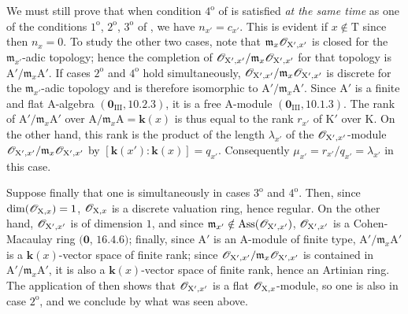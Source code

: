 \begin{env}[21.10.11]
\label{IV.21.10.11}
We must still prove that when condition $4^{\mathrm{o}}$ of  is satisfied \emph{at the same time} as one of the conditions $1^{\mathrm{o}}$, $2^{\mathrm{o}}$, $3^{\mathrm{o}}$ of , we have $n_{x'}=c_{x'}$.
This is evident if $x\notin\mathrm{T}$ since then $n_x=0$.
To study the other two cases, note that $\mathfrak{m}_x\mathscr{O}_{\mathrm{X}',x'}$ is closed for the $\mathfrak{m}_{x'}$-adic topology; hence the completion of $\mathscr{O}_{\mathrm{X}',x'}/\mathfrak{m}_x\mathscr{O}_{\mathrm{X}',x'}$ for that topology is $\mathrm{A}'/\mathfrak{m}_x\mathrm{A}'$.
If cases $2^{\mathrm{o}}$ and $4^{\mathrm{o}}$ hold simultaneously, $\mathscr{O}_{\mathrm{X}',x'}/\mathfrak{m}_x\mathscr{O}_{\mathrm{X}',x'}$ is discrete for the $\mathfrak{m}_{x'}$-adic topology and is therefore isomorphic to $\mathrm{A}'/\mathfrak{m}_x\mathrm{A}'$.
Since $\mathrm{A}'$ is a finite and flat $\mathrm{A}$-algebra $(\mathbf{0}_{\mathrm{III}},10.2.3)$, it is a free $\mathrm{A}$-module $(\mathbf{0}_{\mathrm{III}},10.1.3)$.
The rank of $\mathrm{A}'/\mathfrak{m}_x\mathrm{A}'$ over $\mathrm{A}/\mathfrak{m}_x\mathrm{A}=\boldsymbol{k}(x)$ is thus equal to the rank $r_{x'}$ of $\mathrm{K}'$ over $\mathrm{K}$.
On the other hand, this rank is the product of the length $\lambda_{x'}$ of the $\mathscr{O}_{\mathrm{X}',x'}$-module $\mathscr{O}_{\mathrm{X}',x'}/\mathfrak{m}_x\mathscr{O}_{\mathrm{X}',x'}$ by $[\boldsymbol{k}(x'): \boldsymbol{k}(x)]=q_{x'}$.
Consequently $\mu_{x'}=r_{x'}/q_{x'}=\lambda_{x'}$ in this case.

Suppose finally that one is simultaneously in cases $3^{\mathrm{o}}$ and $4^{\mathrm{o}}$.
Then, since $\dim(\mathscr{O}_{\mathrm{X},x})=1$, $\mathscr{O}_{\mathrm{X},x}$ is a discrete valuation ring, hence regular.
On the other hand, $\mathscr{O}_{\mathrm{X}',x'}$ is of dimension $1$, and since $\mathfrak{m}_{x'}\notin\operatorname{Ass}(\mathscr{O}_{\mathrm{X}',x'})$, $\mathscr{O}_{\mathrm{X}',x'}$ is a Cohen-Macaulay ring $(\mathbf{0}$, $16.4.6)$; finally, since $\mathrm{A}'$ is an A-module of finite type, $\mathrm{A}'/\mathfrak{m}_x\mathrm{A}'$ is a $\boldsymbol{k}(x)$-vector space of finite rank; since $\mathscr{O}_{\mathrm{X}',x'}/\mathfrak{m}_x\mathscr{O}_{\mathrm{X}',x'}$ is contained in $\mathrm{A}'/\mathfrak{m}_x\mathrm{A}'$, it is also a $\boldsymbol{k}(x)$-vector space of finite rank, hence an Artinian ring.
The application of  then shows that $\mathscr{O}_{\mathrm{X}',x'}$ is a flat $\mathscr{O}_{\mathrm{X},x}$-module, so one is also in case $2^{\mathrm{o}}$, and we conclude by what was seen above.


\end{env}
